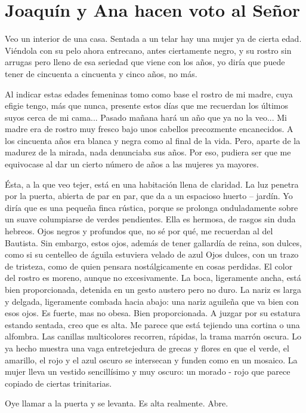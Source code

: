 \documentclass[12pt]{book} %
\begin{document}
\chapter{Joaquín y Ana hacen voto al Señor}

Veo un interior de una casa. Sentada a un telar hay una mujer ya de cierta edad. Viéndola con su pelo ahora entrecano, antes ciertamente negro, y su rostro sin arrugas pero lleno de esa seriedad que viene con los años, yo diría que puede tener de cincuenta a cincuenta y cinco años, no más. 

 Al indicar estas edades femeninas tomo como base el rostro de mi madre, cuya efigie tengo, más que nunca, presente estos días que me recuerdan los últimos suyos cerca de mi cama... Pasado mañana hará un año que ya no la veo... Mi madre era de rostro muy fresco bajo unos cabellos precozmente encanecidos. A los cincuenta años era blanca y negra como al final de la vida. Pero, aparte de la madurez de la mirada, nada denunciaba sus años. Por eso, pudiera ser que me equivocase al dar un cierto número de años a las mujeres ya mayores. 

Ésta, a la que veo tejer, está en una habitación llena de claridad. La luz penetra por la puerta, abierta de par en par, que da a un espacioso huerto – jardín. Yo diría que es una pequeña finca rústica, porque se prolonga onduladamente sobre un suave columpiarse de verdes pendientes. Ella es hermosa, de rasgos sin duda hebreos. Ojos negros y profundos que, no sé por qué, me recuerdan al del Bautista. Sin embargo, estos ojos, además de tener gallardía de reina, son dulces, como si su centelleo de águila estuviera velado de azul Ojos dulces, con un trazo de tristeza, como de quien pensara nostálgicamente en cosas perdidas. El color del rostro es moreno, aunque no excesivamente. La boca, ligeramente ancha, está bien proporcionada, detenida en un gesto austero pero no duro. La nariz es larga y delgada, ligeramente combada hacia abajo: una nariz aguileña que va bien con esos ojos. Es fuerte, mas no obesa. Bien proporcionada. A juzgar por su estatura estando sentada, creo que es alta. 
Me parece que está tejiendo una cortina o una alfombra. Las canillas multicolores recorren, rápidas, la trama marrón oscura. Lo ya hecho muestra una vaga entretejedura de grecas y flores en que el verde, el amarillo, el rojo y el azul oscuro se intersecan y funden como en un mosaico. La mujer lleva un vestido sencillísimo y muy oscuro: un morado - rojo que parece copiado de ciertas trinitarias. 

Oye llamar a la puerta y se levanta. Es alta realmente. Abre. 
\end{document}
